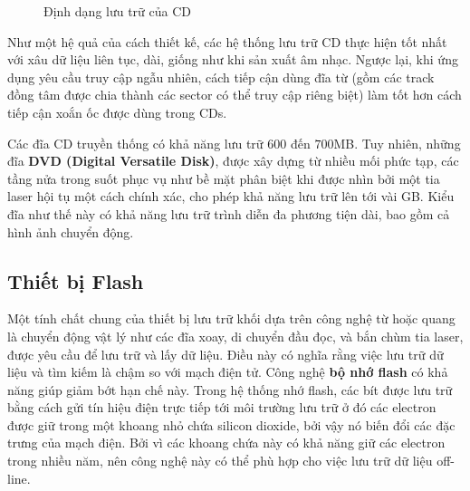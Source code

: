 \begin{figure}[bth]
\centering
\caption{Định dạng lưu trữ của CD}
  \label{fig:fig1.11}
\end{figure}




Như một hệ quả của cách thiết kế, các hệ thống lưu trữ CD thực hiện tốt nhất với xâu dữ
liệu liên tục, dài, giống như khi sản xuất âm nhạc. Ngược lại, khi ứng dụng yêu cầu truy
cập ngẫu nhiên, cách tiếp cận dùng đĩa từ (gồm các track đồng tâm được chia thành các
sector có thể truy cập riêng biệt) làm tốt hơn cách tiếp cận xoắn ốc được dùng trong CDs.

Các đĩa CD truyền thống có khả năng lưu trữ $600$ đến $700$MB. Tuy nhiên, những đĩa
\textbf{DVD (Digital Versatile Disk)}, được xây dựng từ nhiều mối phức tạp, các tầng nửa
trong suốt phục vụ như bề mặt phân biệt khi được nhìn bởi một tia laser hội tụ một cách
chính xác, cho phép khả năng lưu trữ lên tới vài GB. Kiểu đĩa như thế này có khả năng lưu
trữ trình diễn đa phương tiện dài, bao gồm cả hình ảnh chuyển động.

\subsection*{Thiết bị Flash}

Một tính chất chung của thiết bị lưu trữ khối dựa trên công nghệ từ hoặc quang là chuyển
động vật lý như các đĩa xoay, di chuyển đầu đọc, và bắn chùm tia laser, được yêu cầu để
lưu trữ và lấy dữ liệu. Điều này có nghĩa rằng việc lưu trữ dữ liệu và tìm kiếm là chậm so
với mạch điện tử. Công nghệ \textbf{bộ nhớ flash} có khả năng giúp giảm bớt hạn chế
này. Trong hệ thống nhớ flash, các bít được lưu trữ bằng cách gửi tín hiệu điện trực tiếp
tới môi trường lưu trữ ở đó các electron được giữ trong một khoang nhỏ chứa silicon
dioxide, bởi vậy nó biến đổi các đặc trưng của mạch điện. Bởi vì các khoang chứa này có
khả năng giữ các electron trong nhiều năm, nên công nghệ này có thể phù hợp cho việc lưu
trữ dữ liệu off-line.

